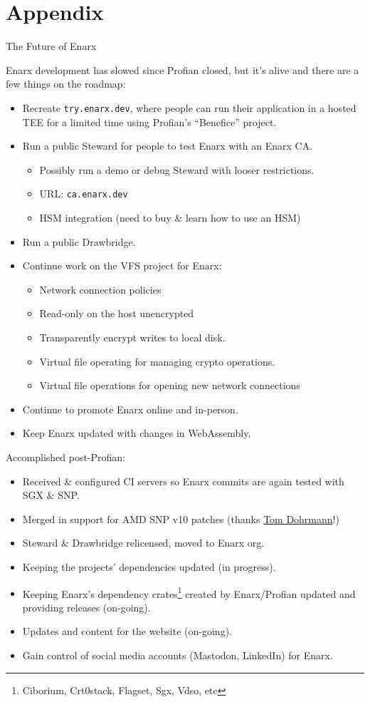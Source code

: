 \documentclass[graphics,compress]{beamer}
\newcommand*\tick{\item[\Checkmark]}
\newcommand{\backupbegin}{
   \newcounter{framenumberappendix}
   \setcounter{framenumberappendix}{\value{framenumber}}
}
\begin{document}
\appendix
\backupbegin
\section{Appendix}
\begin{frame}{The Future of Enarx}
     {
        Enarx development has slowed since Profian closed, but it's alive and there are a few things on the roadmap:
        \begin{itemize}
            \item Recreate \texttt{try.enarx.dev}, where people can run their application in a hosted TEE for a limited time using Profian's ``Benefice'' project.
            \item Run a public Steward for people to test Enarx with an Enarx CA.
            \begin{itemize}
                \item Possibly run a demo or debug Steward with looser restrictions.
                \item URL: \texttt{ca.enarx.dev}
                \item HSM integration (need to buy \& learn how to use an HSM)
            \end{itemize}
            \item Run a public Drawbridge.
            \item Continue work on the VFS project for Enarx:
            \begin{itemize}
                \item Network connection policies
                \item Read-only on the host unencrypted
                \item Transparently encrypt writes to local disk.
                \item Virtual file operating for managing crypto operations.
                \item Virtual file operations for opening new network connections
            \end{itemize}
            \item Continue to promote Enarx online and in-person.
            \item Keep Enarx updated with changes in WebAssembly.
        \end{itemize}
    }
     {
        Accomplished post-Profian:
        \begin{itemize}
            \tick Received \& configured CI servers so Enarx commits are again tested with SGX \& SNP.
            \tick Merged in support for AMD SNP v10 patches (thanks \href{https://github.com/Freax13}{Tom Dohrmann}!)
            \tick Steward \& Drawbridge relicensed, moved to Enarx org.
            \tick Keeping the projects' dependencies updated (in progress).
            \tick Keeping Enarx's dependency crates\footnote{Ciborium, Crt0stack, Flagset, Sgx, Vdso, etc} created by Enarx/Profian updated and providing releases (on-going).
            \tick Updates and content for the website (on-going).
            \tick Gain control of social media accounts (Mastodon, LinkedIn) for Enarx.
        \end{itemize}
    }
\end{frame}
\end{document}
